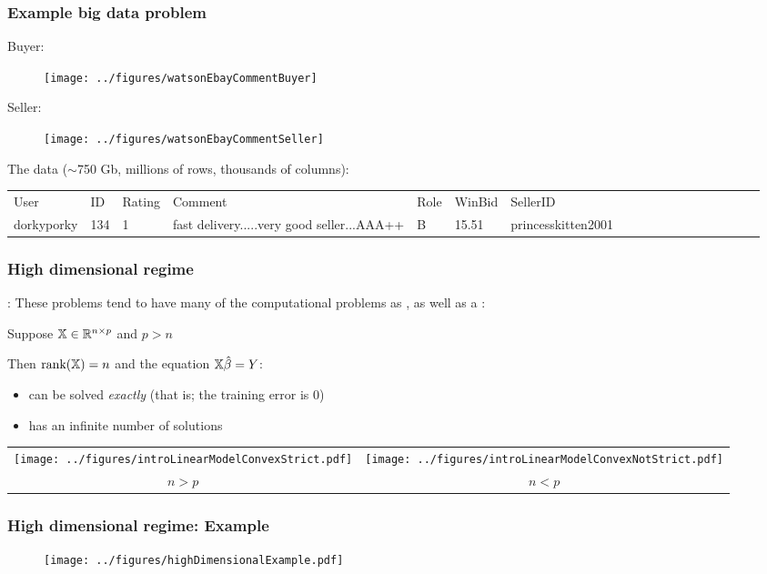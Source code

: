 \documentclass{beamer}
\begin{document}
\begin{frame}
\frametitle{Example big data problem}
Buyer:
\vspace{-.3in}
\begin{figure}[h]
   \centering
   \texttt{[image: ../figures/watsonEbayCommentBuyer]}\\
\end{figure}
\vsp

Seller:
\vspace{-.3in}
\begin{figure}[h]
   \centering
   \texttt{[image: ../figures/watsonEbayCommentSeller]}
\end{figure}

\vvsp

The data ($\sim$750 Gb, millions of rows, thousands of columns):
\vvvsp

\tiny
\begin{tabular}{llllllllllllllllll}
  User & ID & Rating                &                     Comment & Role & WinBid &    SellerID  \\
 dorkyporky           &        134    &  1 & fast delivery.....very good seller...AAA++     &      B  &15.51&princesskitten2001
\end{tabular}

\end{frame}
%
%

\begin{frame}
\frametitle{High dimensional regime}
 : These problems tend to have many of the computational problems 
as , as well as a :

\vsp
Suppose $\mathbb{X} \in \mathbb{R}^{n \times p}$ and $p > n$

\vsp
Then $\textrm{rank}(\mathbb{X}) = n$ and the equation $\mathbb{X}\hat{\beta} = Y$:
\begin{itemize}
\item can be solved \emph{exactly} (that is; the training error is 0)
\item has an infinite number of solutions
\end{itemize}

\begin{table}
   \centering
   \begin{tabular}{cc}
   \texttt{[image: ../figures/introLinearModelConvexStrict.pdf]} &
      \texttt{[image: ../figures/introLinearModelConvexNotStrict.pdf]} \\
      $n > p$ & $n < p$ 
      \end{tabular}
\end{table}
\end{frame}

\begin{frame}
\frametitle{High dimensional regime: Example}
\begin{figure}
\centering
   \texttt{[image: ../figures/highDimensionalExample.pdf]} 
\end{figure}
\end{frame}
\end{document}
